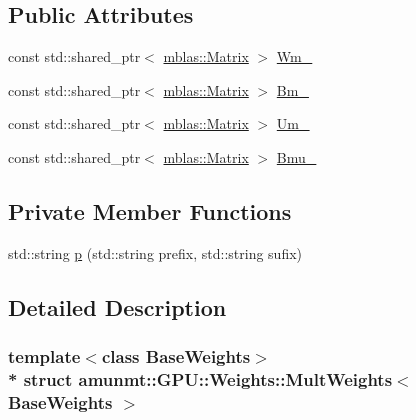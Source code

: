 \subsection*{Public Attributes}
\begin{DoxyCompactItemize}
\item 
const std\+::shared\+\_\+ptr$<$ \hyperlink{namespaceamunmt_1_1GPU_1_1mblas_ab67821a8254de53e45a623cf73c0aef6}{mblas\+::\+Matrix} $>$ \hyperlink{structamunmt_1_1GPU_1_1Weights_1_1MultWeights_aa780446079a7cfa9b2cf4144ff3b8333}{Wm\+\_\+}
\item 
const std\+::shared\+\_\+ptr$<$ \hyperlink{namespaceamunmt_1_1GPU_1_1mblas_ab67821a8254de53e45a623cf73c0aef6}{mblas\+::\+Matrix} $>$ \hyperlink{structamunmt_1_1GPU_1_1Weights_1_1MultWeights_af0a85a328836ed039c475d90e71decab}{Bm\+\_\+}
\item 
const std\+::shared\+\_\+ptr$<$ \hyperlink{namespaceamunmt_1_1GPU_1_1mblas_ab67821a8254de53e45a623cf73c0aef6}{mblas\+::\+Matrix} $>$ \hyperlink{structamunmt_1_1GPU_1_1Weights_1_1MultWeights_ad23eb3a99e7b4c7461d74c0ec153c172}{Um\+\_\+}
\item 
const std\+::shared\+\_\+ptr$<$ \hyperlink{namespaceamunmt_1_1GPU_1_1mblas_ab67821a8254de53e45a623cf73c0aef6}{mblas\+::\+Matrix} $>$ \hyperlink{structamunmt_1_1GPU_1_1Weights_1_1MultWeights_a923bcc07d5054634f8c7f82040cf743d}{Bmu\+\_\+}
\end{DoxyCompactItemize}
\subsection*{Private Member Functions}
\begin{DoxyCompactItemize}
\item 
std\+::string \hyperlink{structamunmt_1_1GPU_1_1Weights_1_1MultWeights_a2e18faba26c8c8e28487fd8db47a7680}{p} (std\+::string prefix, std\+::string sufix)
\end{DoxyCompactItemize}


\subsection{Detailed Description}
\subsubsection*{template$<$class Base\+Weights$>$\\*
struct amunmt\+::\+G\+P\+U\+::\+Weights\+::\+Mult\+Weights$<$ Base\+Weights $>$}



